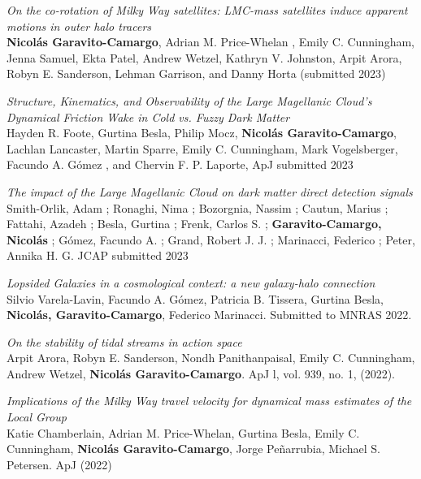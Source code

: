 \documentclass[UTF8]{article}
\begin{document}
\begin{etaremune}
\item \textit{On the co-rotation of Milky Way satellites: LMC-mass satellites induce apparent motions in outer halo tracers}\\ 
  \textbf{Nicol\'as Garavito-Camargo}, Adrian M. Price-Whelan , Emily C. Cunningham, Jenna
Samuel, Ekta Patel, Andrew Wetzel, Kathryn V. Johnston, Arpit Arora, Robyn E.
Sanderson, Lehman Garrison, and Danny Horta (submitted 2023) 


\item \textit{Structure, Kinematics, and Observability of the Large Magellanic
  Cloud's Dynamical Friction Wake in Cold vs. Fuzzy Dark Matter}\\
 Hayden R. Foote, Gurtina Besla, Philip Mocz, \textbf{Nicol\'as
 Garavito-Camargo},
 Lachlan Lancaster, Martin Sparre, Emily C. Cunningham, Mark Vogelsberger, Facundo A. Gómez , and Chervin F. P. Laporte, ApJ submitted 2023\\


\item \textit{The impact of the Large Magellanic Cloud on dark matter direct detection signals}\\
 Smith-Orlik, Adam ; Ronaghi, Nima ; Bozorgnia, Nassim ; Cautun, Marius ; Fattahi, Azadeh ; Besla, Gurtina ; Frenk, Carlos S. ; \textbf{Garavito-Camargo, Nicol\'as} ; Gómez, Facundo A. ; Grand, Robert J. J. ; Marinacci, Federico ; Peter, Annika H. G. JCAP submitted 2023\\

\item \textit{Lopsided Galaxies in a cosmological context: a new galaxy-halo connection}\\ 
Silvio Varela-Lavin, Facundo A. Gómez, Patricia B. Tissera, Gurtina Besla, \textbf{Nicol\'as, Garavito-Camargo}, Federico Marinacci. Submitted to MNRAS 2022.\\ 

\item \textit{On the stability of tidal streams in action space}\\
  Arpit Arora, Robyn E. Sanderson, Nondh Panithanpaisal, Emily C. Cunningham, Andrew Wetzel, \textbf{Nicol\'as Garavito-Camargo}. ApJ l, vol. 939, no. 1, (2022). 


\item \textit{Implications of the Milky Way travel velocity for dynamical mass
  estimates of the Local Group}\\
  Katie Chamberlain, Adrian M. Price-Whelan, Gurtina Besla, Emily C. Cunningham, \textbf{Nicol\'as Garavito-Camargo}, Jorge Peñarrubia, Michael S. Petersen. ApJ (2022)\\  


\end{etaremune}
\end{document}
